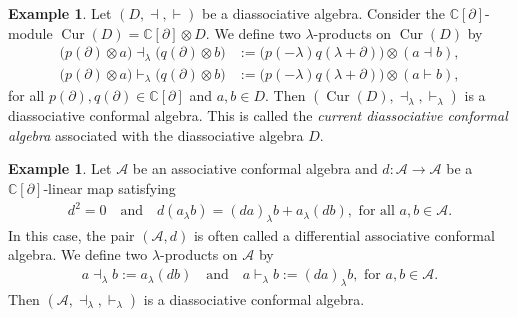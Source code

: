 \documentclass[a4paper,reqno,10pt]{amsart}
\theoremstyle{plain}
\theoremstyle{definition}
\newtheorem{exam}[thm]{Example}
\theoremstyle{remark}
\newcommand{\C}{\mathbb{C}}
\newcommand{\la}{\lambda}
\begin{document}
\begin{exam}\label{cur-d}
Let $(D,\dashv,\vdash)$ be a diassociative algebra. Consider the $\C[\partial]$-module $\operatorname{Cur}(D)=\C[\partial]\otimes D$. We define two $\la$-products on $\operatorname{Cur}(D)$ by
\begin{align*}
\big(p(\partial)\otimes a\big)\dashv_{\la}\big(q(\partial)\otimes b\big)
&:=
\big(p(-\la)q(\la+\partial)\big)\otimes(a\dashv b),\\
\big(p(\partial)\otimes a\big)\vdash_{\la}\big(q(\partial)\otimes b\big)
&:=
\big(p(-\la)q(\la+\partial)\big)\otimes(a\vdash b),
\end{align*}
for all $p(\partial),q(\partial)\in\C[\partial]$ and $a,b\in D$. Then $(\operatorname{Cur}(D),\dashv_{\la},\vdash_{\la} )$ is a diassociative conformal algebra. This is called the
\emph{current diassociative conformal algebra} associated with the
diassociative algebra $D$.
\end{exam}

\begin{exam}
Let $\mathcal{A}$ be an associative conformal algebra and $d:\mathcal{A}\to\mathcal{A}$ be a $\C[\partial]$-linear map satisfying
\begin{align*}
d^{2}=0 ~~~ \text{ and } ~~~ d(a_{\la}b)=(da)_{\la}b+a_{\la}(db), \text{ for all }a,b\in\mathcal{A}.
\end{align*}
In this case, the pair $(\mathcal{A},d)$ is often called a differential associative conformal algebra. We define two $\la$-products on $\mathcal{A}$ by
\begin{align*}
a\dashv_{\la}b:=a_{\la}(db) ~~~ \text{ and } ~~~ 
a\vdash_{\la}b:=(da)_{\la}b, \text{ for }a,b\in\mathcal{A}.
\end{align*}
Then $(\mathcal{A},\dashv_{\la},\vdash_{\la})$ is a diassociative conformal algebra.
\end{exam}
\end{document}
